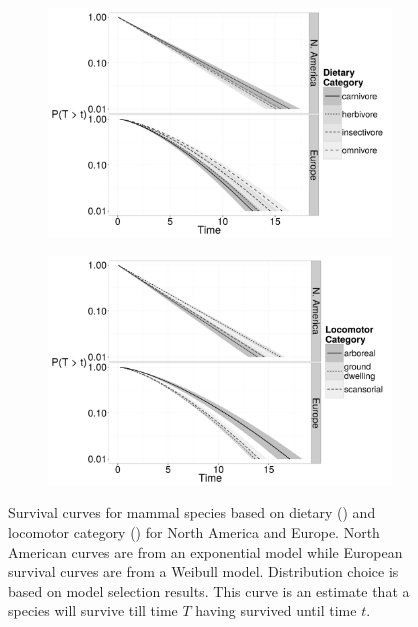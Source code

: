 \documentclass[11pt,letterpaper]{article}
\begin{document}
\begin{figure}[ht]
  \centering
  \begin{subfigure}[b]{0.48\textwidth}
    \caption{}
    \includegraphics[width = \textwidth, keepaspectratio = true]{figure/para_diet}
    \label{subfig:diet}
  \end{subfigure}
  \begin{subfigure}[b]{0.48\textwidth}
    \caption{}
    \includegraphics[width = \textwidth, keepaspectratio = true]{figure/para_move}
    \label{subfig:loco}
  \end{subfigure}
  \caption{Survival curves for mammal species based on dietary () and locomotor category () for North America and Europe. North American curves are from an exponential model while European survival curves are from a Weibull model. Distribution choice is based on model selection results. This curve is an estimate that a species will survive till time \(T\) having survived until time \(t\).}
  \label{fig:surv}
\end{figure}
\end{document}
